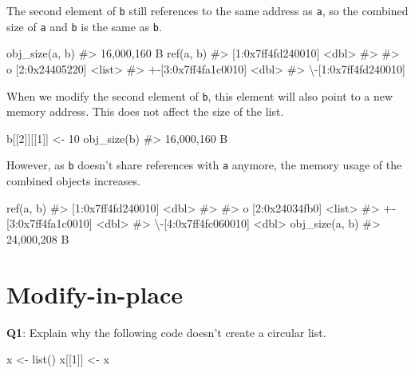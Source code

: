 \documentclass[
]{krantz}
\makeatletter
\newenvironment{Shaded}{\begin{snugshade}}{\end{snugshade}}
\newcommand{\CommentTok}[1]{\textcolor[rgb]{0.56,0.35,0.01}{\textit{#1}}}
\newcommand{\DecValTok}[1]{\textcolor[rgb]{0.00,0.00,0.81}{#1}}
\newcommand{\KeywordTok}[1]{\textcolor[rgb]{0.13,0.29,0.53}{\textbf{#1}}}
\newcommand{\NormalTok}[1]{#1}
\newcommand{\StringTok}[1]{\textcolor[rgb]{0.31,0.60,0.02}{#1}}
\newenvironment{kframe}{%
\medskip{}
\setlength{\fboxsep}{.8em}
 \def\at@end@of@kframe{}%
 \ifinner\ifhmode%
  \def\at@end@of@kframe{\end{minipage}}%
  \begin{minipage}{\columnwidth}%
 \fi\fi%
 \def\FrameCommand##1{\hskip\@totalleftmargin \hskip-\fboxsep
 \colorbox{shadecolor}{##1}\hskip-\fboxsep
     \hskip-\linewidth \hskip-\@totalleftmargin \hskip\columnwidth}%
 \MakeFramed {\advance\hsize-\width
   \@totalleftmargin\z@ \linewidth\hsize
   \@setminipage}}%
 {\par\unskip\endMakeFramed%
 \at@end@of@kframe}
\renewenvironment{Shaded}{\begin{kframe}}{\end{kframe}}
\renewcommand{\KeywordTok} [1]{\textcolor[rgb]{0.00,0.44,0.13}{{#1}}}
\renewcommand{\DecValTok}  [1]{\textcolor[rgb]{0.25,0.63,0.44}{{#1}}}
\renewcommand{\StringTok}  [1]{\textcolor[rgb]{0.25,0.44,0.63}{{#1}}}
\renewcommand{\CommentTok} [1]{\textcolor[rgb]{0.38,0.63,0.69}{{#1}}}
\renewcommand{\NormalTok}  [1]{{#1}}
\makeatother
\begin{document}
The second element of \texttt{b} still references to the same address as \texttt{a}, so the combined size of \texttt{a} and \texttt{b} is the same as \texttt{b}.

\begin{Shaded}
\begin{Highlighting}[]
\KeywordTok{obj_size}\NormalTok{(a, b) }
\CommentTok{#> 16,000,160 B}
\KeywordTok{ref}\NormalTok{(a, b)}
\CommentTok{#> [1:0x7ff4fd240010] <dbl> }
\CommentTok{#>  }
\CommentTok{#> o [2:0x24405220] <list> }
\CommentTok{#> +-[3:0x7ff4fa1c0010] <dbl> }
\CommentTok{#> \textbackslash{}-[1:0x7ff4fd240010]}
\end{Highlighting}
\end{Shaded}

When we modify the second element of \texttt{b}, this element will also point to a new memory address. This does not affect the size of the list.

\begin{Shaded}
\begin{Highlighting}[]
\NormalTok{b[[}\DecValTok{2}\NormalTok{]][[}\DecValTok{1}\NormalTok{]] <-}\StringTok{ }\DecValTok{10}
\KeywordTok{obj_size}\NormalTok{(b) }
\CommentTok{#> 16,000,160 B}
\end{Highlighting}
\end{Shaded}

However, as \texttt{b} doesn't share references with \texttt{a} anymore, the memory usage of the combined objects increases.

\begin{Shaded}
\begin{Highlighting}[]
\KeywordTok{ref}\NormalTok{(a, b)}
\CommentTok{#> [1:0x7ff4fd240010] <dbl> }
\CommentTok{#>  }
\CommentTok{#> o [2:0x24034fb0] <list> }
\CommentTok{#> +-[3:0x7ff4fa1c0010] <dbl> }
\CommentTok{#> \textbackslash{}-[4:0x7ff4fc060010] <dbl>}
\KeywordTok{obj_size}\NormalTok{(a, b) }
\CommentTok{#> 24,000,208 B}
\end{Highlighting}
\end{Shaded}

\hypertarget{modify-in-place}{%
\section{Modify-in-place}\label{modify-in-place}}

\textbf{{Q1}}: Explain why the following code doesn't create a circular list.

\begin{Shaded}
\begin{Highlighting}[]
\NormalTok{x <-}\StringTok{ }\KeywordTok{list}\NormalTok{()}
\NormalTok{x[[}\DecValTok{1}\NormalTok{]] <-}\StringTok{ }\NormalTok{x}
\end{Highlighting}
\end{Shaded}
\end{document}
